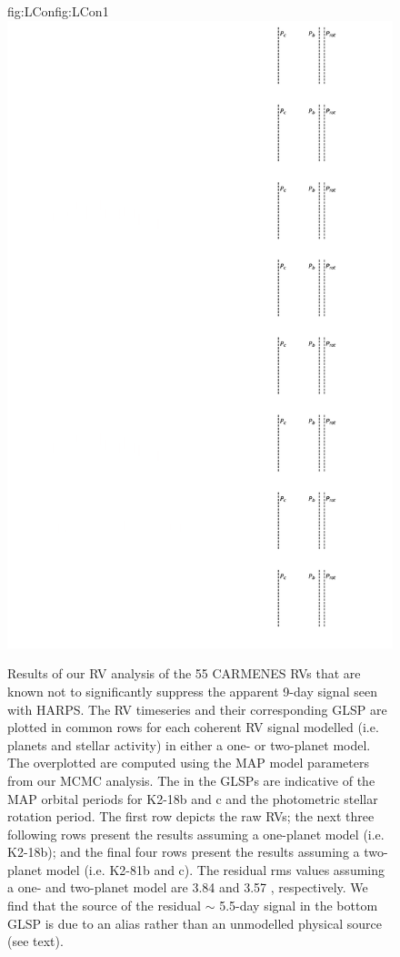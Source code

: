 \begin{figure}
\begin{ocg}{fig:LCon}{fig:LCon}{1}
  \includegraphics[width=0.8\hsize]{figures/analysisC_lines.png}%
  \end{ocg}
  \hspace{-0.8\hsize}%
  \caption[RV timeseries and models from analysis of the K2-18 CARMENES RVs.]
    {\small Results of our RV analysis of the 55 CARMENES RVs that are known not to significantly
    suppress the apparent 9-day signal seen with HARPS. The RV timeseries and their corresponding GLSP
    are plotted in common rows for each coherent RV signal modelled (i.e. planets and stellar
    activity) in either a one- or two-planet model. The overplotted
     are computed using
    the MAP model parameters from our MCMC analysis. The
     in the GLSPs are
    indicative of the MAP orbital periods for K2-18b and c and the photometric stellar rotation period. 
    The first row depicts the raw RVs; the next three following rows present the results
    assuming a one-planet model (i.e. K2-18b); and the final four rows present the results assuming a two-planet
    model (i.e. K2-81b and c). The residual rms values assuming a one- and two-planet model are
    3.84 and 3.57 \mps{}, respectively. We find that the source of the residual $\sim$ 5.5-day signal in the
    bottom GLSP is due to an alias rather than  an unmodelled physical source (see text).}
  \label{k2182fig:analysisC}
\end{figure}


